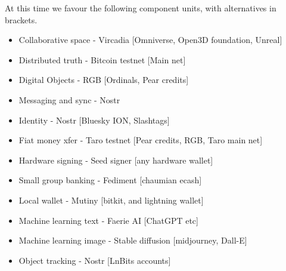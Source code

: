 At this time we favour the following component units, with alternatives in brackets.
\begin{itemize}
\item Collaborative space - Vircadia [Omniverse, Open3D foundation, Unreal]
\item Distributed truth - Bitcoin testnet [Main net]
\item Digital Objects - RGB [Ordinals, Pear credits]
\item Messaging and sync - Nostr 
\item Identity - Nostr [Bluesky ION, Slashtags]
\item Fiat money xfer - Taro testnet [Pear credits, RGB, Taro main net]
\item Hardware signing - Seed signer [any hardware wallet]
\item Small group banking - Fediment [chaumian ecash]
\item Local wallet - Mutiny [bitkit, and lightning wallet]
\item Machine learning text - Faerie AI [ChatGPT etc]
\item Machine learning image - Stable diffusion [midjourney, Dall-E]
\item Object tracking - Nostr [LnBits accounts]
\end{itemize}

